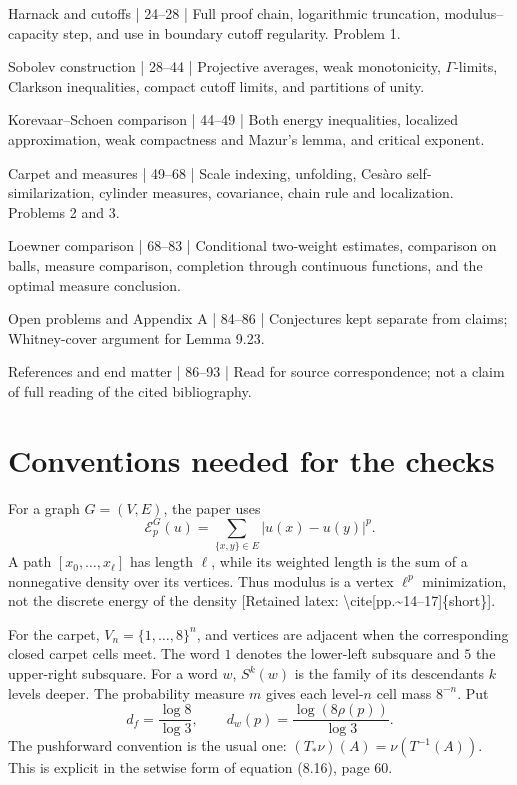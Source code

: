 \documentclass[10pt]{article}
\begin{document}
Harnack and cutoffs | 24–28 | Full proof chain, logarithmic truncation, modulus–capacity step, and use in boundary cutoff regularity. Problem 1.\par
Sobolev construction | 28–44 | Projective averages, weak monotonicity, \(\Gamma\)-limits, Clarkson inequalities, compact cutoff limits, and partitions of unity.\par
Korevaar–Schoen comparison | 44–49 | Both energy inequalities, localized approximation, weak compactness and Mazur’s lemma, and critical exponent.\par
Carpet and measures | 49–68 | Scale indexing, unfolding, Cesàro self-similarization, cylinder measures, covariance, chain rule and localization. Problems 2 and 3.\par
Loewner comparison | 68–83 | Conditional two-weight estimates, comparison on balls, measure comparison, completion through continuous functions, and the optimal measure conclusion.\par
Open problems and Appendix A | 84–86 | Conjectures kept separate from claims; Whitney-cover argument for Lemma 9.23.\par
References and end matter | 86–93 | Read for source correspondence; not a claim of full reading of the cited bibliography.\par
\section*{Conventions needed for the checks}
For a graph \(G=(V,E)\), the paper uses \[\mathcal E_p^G(u)=\sum_{\{x,y\}\in E}|u(x)-u(y)|^p.\] A path \([x_0,\ldots,x_\ell]\) has length \(\ell\), while its weighted length is the sum of a nonnegative density over its vertices. Thus modulus is a vertex \(\ell^p\) minimization, not the discrete energy of the density [Retained latex: \textbackslash{}cite[pp.\textasciitilde{}14--17]\{short\}].\par
For the carpet, \(V_n=\{1,\ldots,8\}^n\), and vertices are adjacent when the corresponding closed carpet cells meet. The word \(1\) denotes the lower-left subsquare and \(5\) the upper-right subsquare. For a word \(w\), \(S^k(w)\) is the family of its descendants \(k\) levels deeper. The probability measure \(m\) gives each level-\(n\) cell mass \(8^{-n}\). Put \[d_f=\frac{\log 8}{\log 3},\qquad
 d_w(p)=\frac{\log(8\rho(p))}{\log3}.\] The pushforward convention is the usual one: \((T_*\nu)(A)=\nu(T^{-1}(A))\). This is explicit in the setwise form of equation (8.16), page 60.\par
\end{document}
